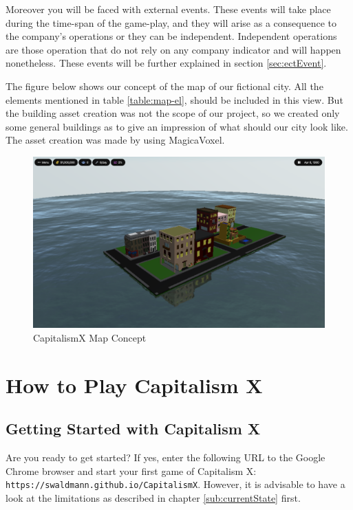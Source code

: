 \documentclass[11pt,titlepage,oneside,openany]{book}
\begin{document}
Moreover you will be faced with external events. These events will take place during the time-span of the game-play, and they will arise as a consequence to the company’s operations or they can be independent. Independent operations are those operation that do not rely on any company indicator and will happen nonetheless. These events will be further explained in section \ref{sec:ectEvent}.	

The figure below shows our concept of the map of our fictional city. All the elements mentioned in table \ref{table:map-el}, should be included in this view. But the building asset creation was not the scope of our project, so we created only some general buildings as to give an impression
of what should our city look like. The asset creation was made by using MagicaVoxel\footnotemark. 
\begin{figure} [!ht]
    \centering
    \includegraphics[scale=0.23]{images/screenshot-map.png}
    \caption{CapitalismX Map Concept}
    \label{fig:map}
\end{figure}



\chapter{How to Play Capitalism X}
\label{cha:howtoplay}

\section{Getting Started with Capitalism X}

Are you ready to get started? If yes, enter the following URL to the Google Chrome browser and start your first game of Capitalism X: \\
\texttt{https://swaldmann.github.io/CapitalismX}.
However, it is advisable to have a look at the limitations as described in chapter \ref{sub:currentState} first.
\end{document}
